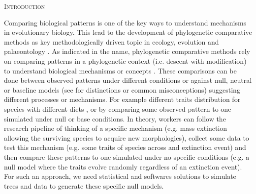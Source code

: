 \documentclass[12pt,letterpaper]{article}
\renewcommand{\section}[1]{%
\bigskip
\begin{center}
\begin{Large}
\normalfont\scshape #1
\medskip
\end{Large}
\end{center}}
\begin{document}
%
%

\section{Introduction}

Comparing biological patterns is one of the key ways to understand mechanisms in evolutionary biology.
This lead to the development of phylogenetic comparative methods as key methodologically driven topic in ecology, evolution and palaeontology \citep{felsensteinPCM,pennell2013review}.
As indicated in the name, phylogenetic comparative methods rely on comparing patterns in a phylogenetic context (i.e. descent with modification) to understand biological mechanisms or concepts \citep{harmon2019book}.
These comparisons can be done between observed patterns under different conditions or against null, neutral or baseline models (see \citealt{bausman2018neutral} for distinctions or common misconceptions) suggesting different processes or mechanisms.
For example different traits distribution for species with different diets \citep{deepak2023diet},
or by comparing some observed pattern to one simulated under null or base conditions\citep{miller2022alternating}.
In theory, workers can follow the research pipeline of thinking of a specific mechanism (e.g. mass extinction allowing the surviving species to acquire new morphologies), collect some data to test this mechanism (e.g. some traits of species across and extinction event) and then compare these patterns to one simulated under no specific conditions (e.g. a null model where the traits evolve randomly regardless of an extinction event)\citep{puttick2020complex}.
For such an approach, we need statistical and softwares solutions to simulate trees and data to generate these specific null models.
\end{document}
